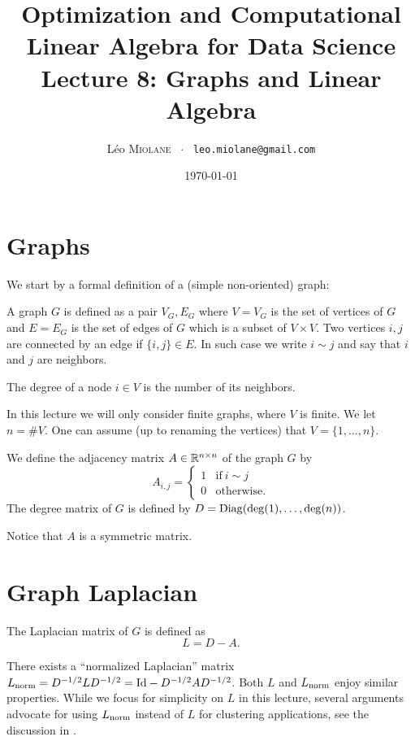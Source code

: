 \documentclass[11pt,nocut]{article}
\title{\vspace{-2.0cm}%
	Optimization and Computational Linear Algebra for Data Science\\
Lecture 8: Graphs and Linear Algebra}
\author{Léo \textsc{Miolane} \ $\cdot$ \ \texttt{leo.miolane@gmail.com}}
\date{\today}
\begin{document}
\maketitle


\section{Graphs}

We start by a formal definition of a (simple non-oriented) graph:
\begin{definition}[Graph]
	A graph $G$ is defined as a pair $V_G,E_G$ where $V=V_G$ is the set of vertices of $G$ and $E = E_G$ is the set of edges of $G$ which is a subset of $V \times V$.
	Two vertices $i,j$ are connected by an edge if $\{i,j\} \in E$. In such case we write $i \sim j$ and say that $i$ and $j$ are neighbors.
\end{definition}

\begin{definition}
	The degree of a node $i \in V$ is the number of its neighbors.
\end{definition}

In this lecture we will only consider finite graphs, where $V$ is finite. We let $n = \# V$. One can assume (up to renaming the vertices) that $V = \{1, \dots, n\}$.

\begin{definition}
	We define the adjacency matrix $A \in \mathbb{R}^{n \times n}$ of the graph $G$ by
	$$
	A_{i,j} = 
	\begin{cases}
		1 & \text{if} \ i \sim j \\
		0 & \text{otherwise.}
	\end{cases}
	$$
	The degree matrix of $G$ is defined by $D = {{\rm Diag}}({\rm deg}(1), \dots, {\rm deg}(n))$. 
\end{definition}

Notice that $A$ is a symmetric matrix.

\section{Graph Laplacian}

\begin{definition}
	The Laplacian matrix of $G$ is defined as
	$$
	L = D - A.
	$$
\end{definition}

\begin{remark}
	There exists a ``normalized Laplacian'' matrix $L_{\rm norm} = D^{-1/2} L D^{-1/2} = {{\rm Id}} - D^{-1/2} A D^{-1/2}$. Both $L$ and $L_{\rm norm}$ enjoy similar properties.
	While we focus for simplicity on $L$ in this lecture, several arguments advocate for using $L_{\rm norm}$ instead of $L$ for clustering applications, see the discussion in \cite[Section~8.4]{von2007tutorial}.
\end{remark}
\end{document}
